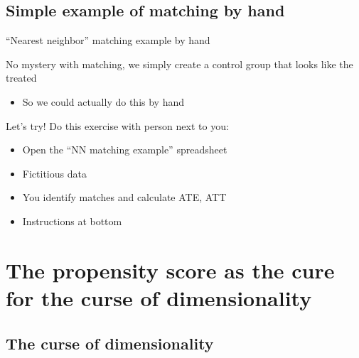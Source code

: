 \subsection[Matching by hand]{Simple example of matching by hand}


\begin{frame}{``Nearest neighbor'' matching example by hand}

	No mystery with matching, we simply create a control group that looks like the treated
	\begin{itemize}
		\item So we could actually do this by hand
	\end{itemize}
	
	\vspace{3mm}
	
	Let's try! Do this exercise with person next to you:
	\begin{itemize}
		\item Open the ``NN matching example'' spreadsheet \href{https://www.dropbox.com/s/ajqmhzomdwaxzt0/NN\%20matching\%20example.xlsx?dl=0}{}
		\item Fictitious data
		\item You identify matches and calculate ATE, ATT
		\item Instructions at bottom
	\end{itemize}

\end{frame}

\section[Curse and cure]{The propensity score as the cure for the curse of dimensionality}

\subsection[Curse]{The curse of dimensionality}

